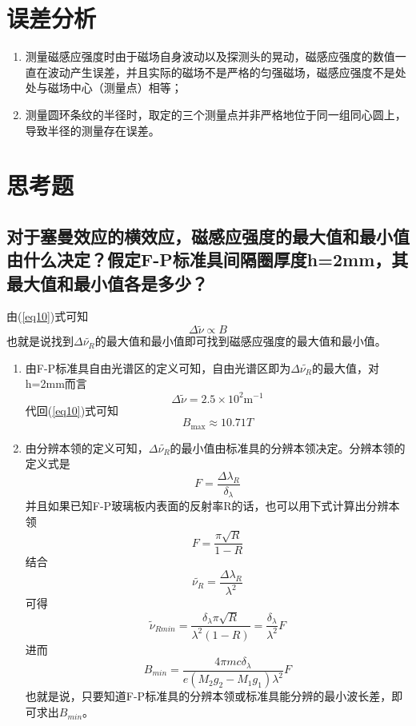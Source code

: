 \documentclass[a4paper]{article}
\begin{document}
\section{误差分析}
\begin{enumerate}
\item 测量磁感应强度时由于磁场自身波动以及探测头的晃动，磁感应强度的数值一直在波动产生误差，并且实际的磁场不是严格的匀强磁场，磁感应强度不是处处与磁场中心（测量点）相等；
\item 测量圆环条纹的半径时，取定的三个测量点并非严格地位于同一组同心圆上，导致半径的测量存在误差。
\end{enumerate}

\section{思考题}
\subsection{对于塞曼效应的横效应，磁感应强度的最大值和最小值由什么决定？假定F-P标准具间隔圈厚度h=2mm，其最大值和最小值各是多少？}
由(\ref{eq10})式可知
\begin{equation*}
\Delta\tilde{\nu}\propto B
\end{equation*}
也就是说找到$\Delta\tilde{\nu_R}$的最大值和最小值即可找到磁感应强度的最大值和最小值。
\begin{enumerate}
\item 由F-P标准具自由光谱区的定义可知，自由光谱区即为$\Delta\tilde{\nu_R}$的最大值，对h=2mm而言
\begin{equation*}
\Delta\tilde{\nu} = 2.5\times 10^2\text{m}^{-1}
\end{equation*}
代回(\ref{eq10})式可知
\begin{equation*}
B_{\text{max}} \approx 10.71T
\end{equation*}
\item 由分辨本领的定义可知，$\Delta\tilde{\nu_R}$的最小值由标准具的分辨本领决定。分辨本领的定义式是
\begin{equation*}
F = \frac{\Delta\lambda_R}{\delta_\lambda}
\end{equation*}
并且如果已知F-P玻璃板内表面的反射率R的话，也可以用下式计算出分辨本领
\begin{equation*}
F = \frac{\pi\sqrt{R}}{1-R}
\end{equation*}
结合
\begin{equation*}
\tilde{\nu_R} = \frac{\Delta\lambda_R}{\lambda^2}
\end{equation*}
可得
\begin{equation*}
\tilde{\nu}_{Rmin} = \frac{\delta_\lambda\pi\sqrt{R}}{\lambda^2(1-R)} = \frac{\delta_\lambda}{\lambda^2}F
\end{equation*}
进而
\begin{equation*}
B_{min} = \frac{4\pi mc\delta_\lambda}{e(M_2g_2 - M_1g_1)\lambda^2}F
\end{equation*}
也就是说，只要知道F-P标准具的分辨本领或标准具能分辨的最小波长差，即可求出$B_{min}$。
\end{enumerate}
\end{document}
